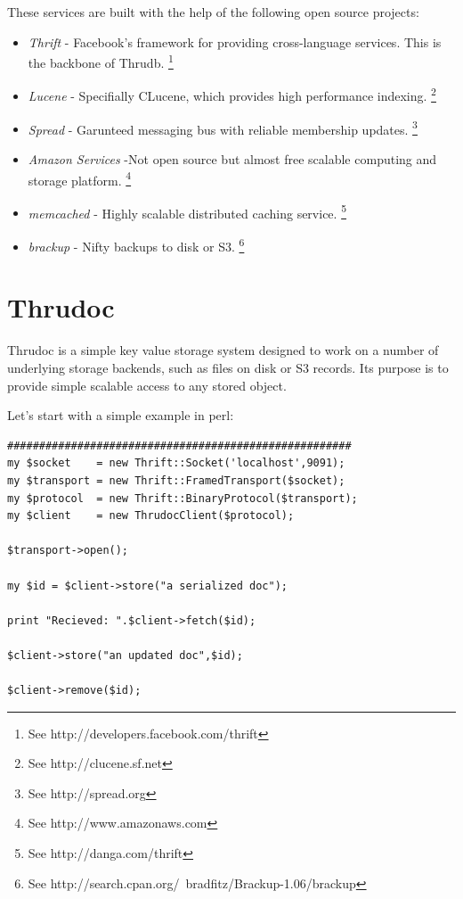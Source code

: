 \documentclass[nocopyrightspace,blockstyle]{sigplanconf}
\begin{document}
These services are built with the help of the following open source projects:
\begin{itemize}
\item\textit{Thrift}    - Facebook's framework for providing cross-language services.  This is the backbone of Thrudb. \footnote{See http://developers.facebook.com/thrift}

\item\textit{Lucene}    - Specifially CLucene, which provides high performance indexing. \footnote{See http://clucene.sf.net}

\item\textit{Spread}    - Garunteed messaging bus with reliable membership updates. \footnote{See http://spread.org}

\item\textit{Amazon Services} -Not open source but almost free scalable computing and storage platform. \footnote{See http://www.amazonaws.com}

\item\textit{memcached} - Highly scalable distributed caching service. \footnote{See http://danga.com/thrift}

\item\textit{brackup}   - Nifty backups to disk or S3. \footnote{See http://search.cpan.org/~bradfitz/Brackup-1.06/brackup}
\end{itemize}

\section{Thrudoc}

Thrudoc is a simple key value storage system designed to work on a number of underlying storage backends, such as files on disk or S3 records.
Its purpose is to provide simple scalable access to any stored object.

Let's start with a simple example in perl: 

\begin{verbatim}
######################################################
my $socket    = new Thrift::Socket('localhost',9091);
my $transport = new Thrift::FramedTransport($socket);
my $protocol  = new Thrift::BinaryProtocol($transport);
my $client    = new ThrudocClient($protocol);

$transport->open();

my $id = $client->store("a serialized doc");
  
print "Recieved: ".$client->fetch($id);

$client->store("an updated doc",$id);

$client->remove($id);

\end{verbatim}
  
\end{document}
